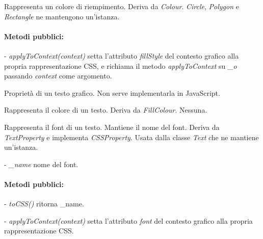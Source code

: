Rappresenta un colore di riempimento.
Deriva da \textit{Colour}.
\textit{Circle}, \textit{Polygon} e \textit{Rectangle} ne mantengono un'istanza.
\paragraph{Metodi pubblici:}
\begin{elencopuntato}[\normindent]
\item[-] \textit{applyToContext(context)} setta l'attributo \textit{fillStyle} del contesto grafico alla propria rappresentazione CSS, e richiama il metodo \textit{applyToContext} su \textit{{\_}o} passando \textit{context} come argomento.
\end{elencopuntato}

Propriet\`a di un testo grafico. Non serve implementarla in JavaScript.

Rappresenta il colore di un testo.
Deriva da \textit{FillColour}.
Nessuna.

Rappresenta il font di un testo. Mantiene il nome del font.
Deriva da \textit{TextProperty} e implementa \textit{CSSProperty}.
Usata dalla classe \textit{Text} che ne mantiene un'istanza.
\begin{elencopuntato}[\normindent]
\item[-] \textit{{\_}name} nome del font.
\end{elencopuntato}
\paragraph{Metodi pubblici:}
\begin{elencopuntato}[\normindent]
\item[-] \textit{toCSS()} ritorna {\_}name.
\item[-] \textit{applyToContext(context)} setta l'attributo \textit{font} del contesto grafico alla propria rappresentazione CSS.
\end{elencopuntato}

